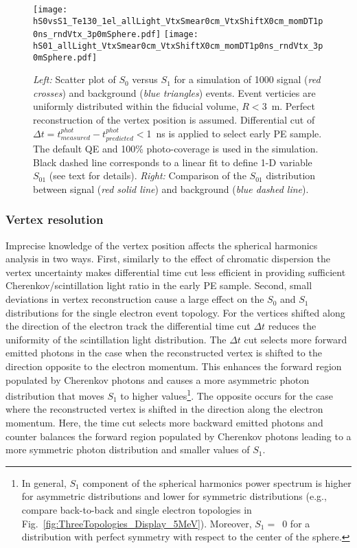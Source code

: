 \begin{figure*}[h]
  \centering
  \texttt{[image: hS0vsS1\_Te130\_1el\_allLight\_VtxSmear0cm\_VtxShiftX0cm\_momDT1p0ns\_rndVtx\_3p0mSphere.pdf]}
  \texttt{[image: hS01\_allLight\_VtxSmear0cm\_VtxShiftX0cm\_momDT1p0ns\_rndVtx\_3p0mSphere.pdf]}
  \caption{\emph{Left:} Scatter plot of $S_0$ versus $S_1$ for a simulation of 1000 signal (\emph{red crosses}) and background
    (\emph{blue triangles}) events. Event verticies are uniformly distributed within the fiducial volume, $R<3$~m.
    Perfect reconstruction of the vertex position is assumed. Differential cut of 
    $\Delta t=t^{phot}_{measured} - t^{phot}_{predicted}<$1~ns is applied to select early PE sample.
    The default QE and 100\% photo-coverage is used in the simulation.
    Black dashed line corresponds to a linear fit to define 1-D variable $S_{01}$ (see text for details).
    \emph{Right:} Comparison of the $S_{01}$ distribution between signal (\emph{red solid line}) and background (\emph{blue dashed line}).}
  \label{fig:SL_Te_SmearX0cm_momDT1ns_rndVtx_3p0m}
\end{figure*}


\subsubsection{Vertex resolution} 
Imprecise knowledge of the vertex position affects the spherical harmonics analysis in two ways. First, similarly to the effect of chromatic 
dispersion the vertex uncertainty makes differential time cut less efficient in providing sufficient Cherenkov/scintillation light ratio
in the early PE sample. Second, small deviations in vertex reconstruction cause a large effect on the $S_0$ and $S_1$ distributions for the 
single electron event topology.
For the vertices shifted along the direction of the electron track the differential time cut $\Delta t$
reduces the uniformity of the scintillation light distribution. The
$\Delta t$ cut selects more forward emitted photons in the case when
the reconstructed vertex is shifted to the direction opposite to the
electron momentum. This enhances the forward region populated by Cherenkov
photons and causes a more asymmetric photon distribution that moves $S_1$ to higher values\footnote{In general, $S_1$ component of the 
spherical harmonics power spectrum is higher for asymmetric distributions and lower for symmetric distributions (e.g., compare back-to-back
and single electron topologies in Fig.~\ref{fig:ThreeTopologies_Display_5MeV}). Moreover, $S_1=$~0 for a distribution with perfect symmetry 
with respect to the center of the sphere.}.  
The opposite occurs for the case where the reconstructed vertex is shifted in the direction along the electron
momentum. Here, the time cut selects more backward emitted photons and counter balances the forward region populated by Cherenkov
photons leading to a more symmetric photon distribution and smaller values of $S_1$.

